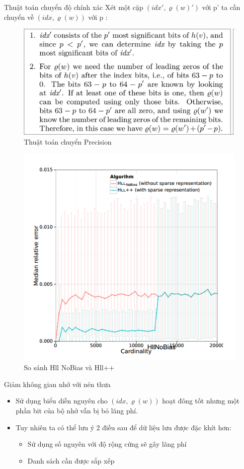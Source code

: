 \documentclass{beamer}
\newcommand{\bi}{\begin{itemize}}
\newcommand{\ei}{\end{itemize}}
\begin{document}
\begin{frame}{Thuật toán chuyển độ chính xác}
Xét một cặp $(idx',\varrho(w)') $ với p' ta cần chuyển về $(idx,\varrho(w)) $ với p : 
\begin{figure}[H]
\includegraphics[scale=0.25]{HSR.png}
\caption {Thuật toán chuyển Precision}
\end{figure}

\end{frame}
\begin{frame}
\begin{figure}
\includegraphics[scale=0.6]{img4.png}
\caption{So sánh Hll NoBias và  Hll++}
\end{figure}
\end{frame}
\begin{frame}{Giảm không gian nhớ với nén thưa }
\bi
\item Sử dụng biểu diễn nguyên cho $(idx,\varrho(w)) $ hoạt đông tốt nhưng một phần bit của bộ nhớ vẫn bị bỏ lãng phí.
\item Tuy nhiên ta có thể lưu ý 2 điều sau để dữ liệu lưu được đặc khít hơn:
\begin{itemize}
\item Sử dụng số nguyên với độ rộng cứng sẽ gây lãng phí
\item Danh sách cần được sắp xếp
\end{itemize}
\ei 
\end{frame}
\end{document}
